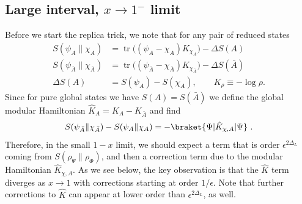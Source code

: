 \documentclass[11pt]{article}
\newcommand{\tr}{\mathrm{tr}}
\newcommand{\ep}{\epsilon}
\newcommand{\nn}{\nonumber}
\newcommand{\lb}{\left(}
\newcommand{\rb}{\right)}
\begin{document}
\subsection{Large interval, \texorpdfstring{$x\to 1^-$ limit}{Large interval, x to 1 minus limit}}
Before we start the replica trick, we note that for any pair of reduced states
\begin{align}
S(\psi_A\|\chi_A)
&=\operatorname{tr}\bigl((\psi_A-\chi_A)K_{\chi_A}\bigr)-\Delta S(A)\nonumber\\
S(\psi_{\bar A}\|\chi_{\bar A})
&=\operatorname{tr}\bigl((\psi_{\bar A}-\chi_{\bar A})K_{\chi_{\bar A}}\bigr)
-\Delta S(\bar A)\nonumber\\
\Delta S(A)
&=S(\psi_A)-S(\chi_A),\qquad K_\rho\equiv -\log\rho .
\end{align}
Since for pure global states we have $S(A)=S(\bar{A})$ we define the global modular Hamiltonian $\hat{K}_A=K_A-K_{\bar{A}}$ and find
\begin{align}\label{Khatformula}
   S(\psi_{\bar{A}}\|\chi_{\bar{A}})-S(\psi_A\|\chi_A)= -\braket{\Psi|\hat{K}_{\chi,A}|\Psi}\ .
\end{align}
Therefore, in the small $1-x$ limit, we should expect a term that is order $\ep^{2\Delta_L}$ coming from $S(\rho_\Psi\|\rho_\Phi)$, and then a correction term due to the modular Hamiltonian $\hat{K}_{\chi,A}$. As we see below, the key observation is that the $\hat{K}$ term diverges as $x\to 1$ with corrections starting at order $1/\ep$. Note that further corrections to $\hat{K}$ can appear at lower order than $\ep^{2\Delta_L}$, as well. 
\end{document}
